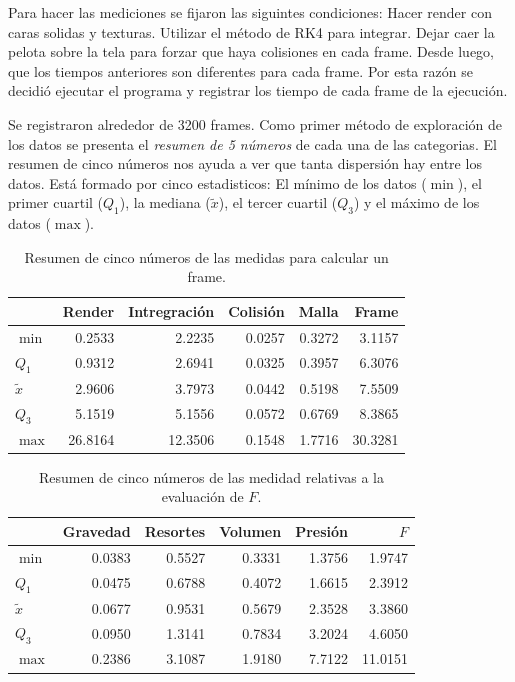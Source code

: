 Para hacer las mediciones se fijaron las siguintes condiciones:
Hacer render con caras solidas y texturas.
Utilizar el método de RK4 para integrar.
Dejar caer la pelota sobre la tela para forzar que haya colisiones en cada frame.
Desde luego, que los tiempos anteriores son diferentes para cada frame.
Por esta razón se decidió ejecutar el programa y registrar los tiempo de cada frame de la ejecución.

Se registraron alrededor de 3200 frames.
Como primer método de exploración de los datos se presenta el \emph{resumen de 5 números} de cada una de las categorias.
El resumen de cinco números nos ayuda a ver que tanta dispersión hay entre los datos.
Está formado por cinco estadisticos: El mínimo de los datos ($\min$), el primer cuartil ($Q_1$), la mediana ($\tilde{x}$), el tercer cuartil ($Q_3$) y el máximo de los datos ($\max$).

\begin{table}
\begin{center}
\begin{tabular} {@{}lrrrrr@{}}
\toprule
 & Render & Intregración & Colisión & Malla & Frame \\
\midrule 
 $\min$      &  0.2533 &  2.2235 & 0.0257 & 0.3272 &  3.1157 \\
 $Q_1$       &  0.9312 &  2.6941 & 0.0325 & 0.3957 &  6.3076 \\
 $\tilde{x}$ &  2.9606 &  3.7973 & 0.0442 & 0.5198 &  7.5509 \\
 $Q_3$       &  5.1519 &  5.1556 & 0.0572 & 0.6769 &  8.3865 \\
 $\max$      & 26.8164 & 12.3506 & 0.1548 & 1.7716 & 30.3281 \\
\bottomrule
\end{tabular}
\end{center}
\caption[Resumen de medidas por frame]{Resumen de cinco números de las medidas para calcular un frame.}
\label{resumenFrame:tabla}
\end{table}

\begin{table}
\begin{center}
\begin{tabular} {@{}lrrrrr@{}}
\toprule
 & Gravedad & Resortes & Volumen & Presión & $F$ \\
\midrule 
 $\min$      & 0.0383 & 0.5527 & 0.3331 & 1.3756 &  1.9747 \\
 $Q_1$       & 0.0475 & 0.6788 & 0.4072 & 1.6615 &  2.3912 \\
 $\tilde{x}$ & 0.0677 & 0.9531 & 0.5679 & 2.3528 &  3.3860 \\
 $Q_3$       & 0.0950 & 1.3141 & 0.7834 & 3.2024 &  4.6050 \\
 $\max$      & 0.2386 & 3.1087 & 1.9180 & 7.7122 & 11.0151 \\
\bottomrule
\end{tabular}
\end{center}
\caption[Resumen de medidas de evaluacion de $F$]{Resumen de cinco números de las medidad relativas a la evaluación de $F$.}
\label{resumenFuerza:tabla}
\end{table}

